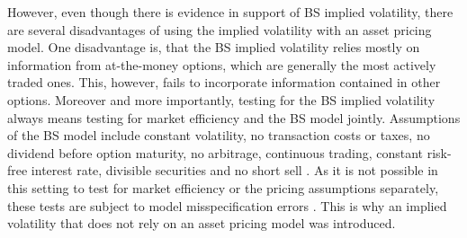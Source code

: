 However, even though there is evidence in support of \ac{BS} implied volatility, there are several disadvantages of using the implied volatility with an asset pricing model. One disadvantage is, that the \ac{BS} implied volatility relies mostly on information from at-the-money options, which are generally the most actively traded ones. This, however, fails to incorporate information contained in other options. Moreover and more importantly, testing for the \ac{BS} implied volatility always means testing for market efficiency and the \ac{BS} model jointly. Assumptions of the \ac{BS} model include constant volatility, no transaction costs or taxes, no dividend before option maturity, no arbitrage, continuous trading, constant risk-free interest rate, divisible securities and no short sell \parencite{poon2003}. As it is not possible in this setting to test for market efficiency or the pricing assumptions separately, these tests are subject to model misspecification errors \parencite{jiang2003}. This is why an implied volatility that does not rely on an asset pricing model was introduced. 


